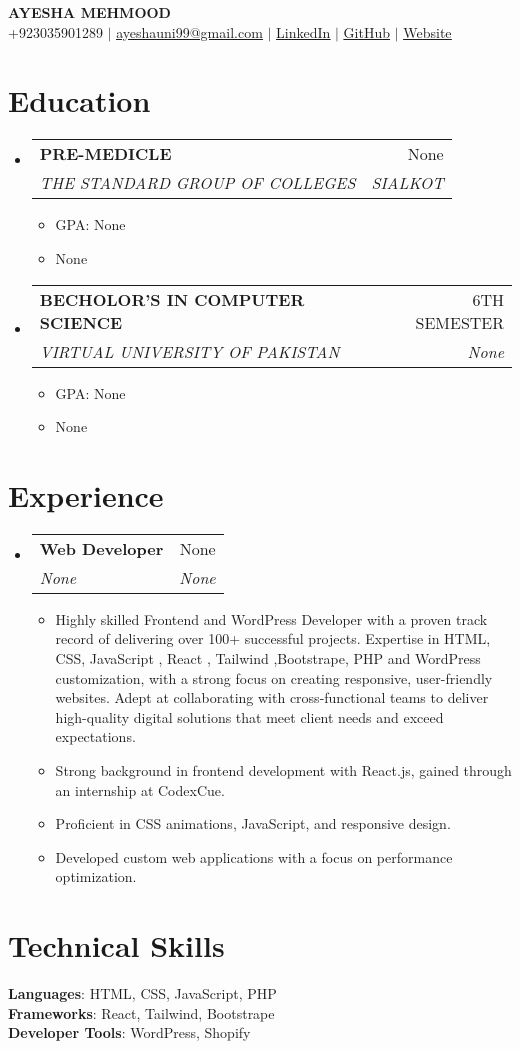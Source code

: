 \documentclass[letterpaper,11pt]{article}
\makeatletter
\newcommand{\resumeItem}[1]{
  \item\small{
    {#1 \vspace{-2pt}}
  }
}
\newcommand{\resumeSubheading}[4]{
  \vspace{-2pt}\item
    \begin{tabular*}{0.97\textwidth}[t]{l@{\extracolsep{\fill}}r}
      \textbf{#1} & #2 \\
      \textit{\small#3} & \textit{\small #4} \\
    \end{tabular*}\vspace{-7pt}
}
\newcommand{\resumeSubHeadingListStart}{\begin{itemize}[leftmargin=0.15in, label={}]}
\newcommand{\resumeSubHeadingListEnd}{\end{itemize}}
\newcommand{\resumeItemListStart}{\begin{itemize}}
\newcommand{\resumeItemListEnd}{\end{itemize}\vspace{-5pt}}
\makeatother
\begin{document}
\begin{center}
    \textbf{\Huge \scshape AYESHA MEHMOOD} \\ \vspace{1pt}
    \small +923035901289 $|$ \href{mailto:ayeshauni99@gmail.com}{\underline{ayeshauni99@gmail.com}} $|$ \href{https://None}{\underline{LinkedIn}} $|$ \href{https://None}{\underline{GitHub}} $|$ \href{https://ayeshamehmood.netlify.app/}{\underline{Website}}
\end{center}

\section{Education}
  \resumeSubHeadingListStart
    \resumeSubheading
      {PRE-MEDICLE}{None}
      {THE STANDARD GROUP OF COLLEGES}{SIALKOT}
      \resumeItemListStart
        \resumeItem{GPA: None}
        \resumeItem{None}
      \resumeItemListEnd
    \resumeSubheading
      {BECHOLOR’S IN COMPUTER SCIENCE}{6TH SEMESTER}
      {VIRTUAL UNIVERSITY OF PAKISTAN}{None}
      \resumeItemListStart
        \resumeItem{GPA: None}
        \resumeItem{None}
      \resumeItemListEnd
  \resumeSubHeadingListEnd

\section{Experience}
  \resumeSubHeadingListStart
    \resumeSubheading
      {Web Developer}{None}
      {None}{None}
      \resumeItemListStart
        \resumeItem{Highly skilled Frontend and WordPress Developer with a proven track record of delivering over 100+ successful projects. Expertise in HTML, CSS, JavaScript , React , Tailwind ,Bootstrape, PHP and WordPress customization, with a strong focus on creating responsive, user-friendly websites. Adept at collaborating with cross-functional teams to deliver high-quality digital solutions that meet client needs and exceed expectations.}
        \resumeItem{Strong background in frontend development with React.js, gained through an internship at CodexCue.}
        \resumeItem{Proficient in CSS animations, JavaScript, and responsive design.}
        \resumeItem{Developed custom web applications with a focus on performance optimization.}
      \resumeItemListEnd
  \resumeSubHeadingListEnd

\section{Technical Skills}
 \begin{itemize}[leftmargin=0.15in, label={}]
    \small{\item{
     \textbf{Languages}: HTML, CSS, JavaScript, PHP \\
     \textbf{Frameworks}: React, Tailwind, Bootstrape \\
     \textbf{Developer Tools}: WordPress, Shopify
    }}
 \end{itemize}

\end{document}
